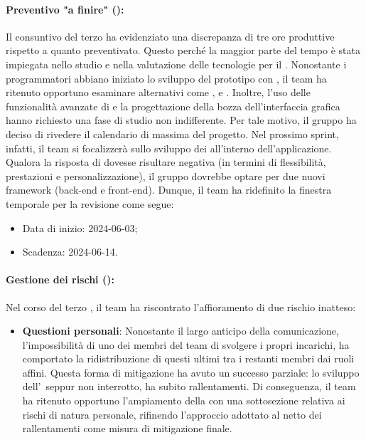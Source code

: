 \paragraph*{Preventivo "a finire" ():}
Il consuntivo del terzo  ha evidenziato una discrepanza di tre ore produttive rispetto a quanto preventivato. Questo perché la maggior parte del tempo è stata impiegata nello studio e nella valutazione delle tecnologie per il . Nonostante i programmatori abbiano iniziato lo sviluppo del prototipo con , il team ha ritenuto opportuno esaminare  alternativi come ,  e . Inoltre, l’uso delle funzionalità avanzate di  e la progettazione della bozza dell’interfaccia grafica hanno richiesto una fase di studio non indifferente. Per tale motivo, il gruppo ha deciso di rivedere il calendario di massima del progetto. Nel prossimo sprint, infatti, il team si focalizzerà sullo sviluppo dei  all’interno dell’applicazione. Qualora la risposta di  dovesse risultare negativa (in termini di flessibilità, prestazioni e personalizzazione), il gruppo dovrebbe optare per due nuovi framework (back-end e front-end). Dunque, il team ha ridefinito la finestra temporale per la revisione  come segue:
\begin{itemize}
  \item Data di inizio: 2024-06-03;
  \item Scadenza: 2024-06-14.
\end{itemize}

\paragraph*{Gestione dei rischi ():}
\par Nel corso del terzo , il team ha riscontrato l'affioramento di due rischio inatteso:
\begin{itemize}
  \item \textbf{Questioni personali}: Nonostante il largo anticipo della comunicazione, l'impossibilità di uno dei membri del team di svolgere i propri incarichi, ha comportato la ridistribuzione di questi ultimi tra i restanti membri dai ruoli affini. 
  Questa forma di mitigazione ha avuto un successo parziale: lo sviluppo dell'\AdR\, seppur non interrotto, ha subito rallentamenti.
  Di conseguenza, il team ha ritenuto opportuno l'ampiamento della  con una sottosezione relativa ai rischi di natura personale, rifinendo l'approccio adottato al netto dei rallentamenti come misura di mitigazione finale.
\end{itemize}

